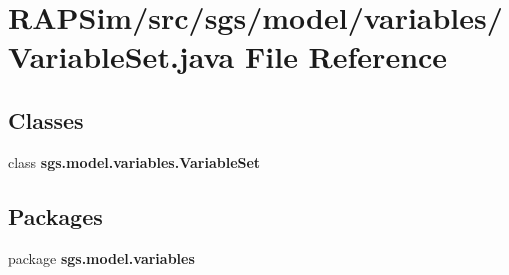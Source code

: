 \section{R\-A\-P\-Sim/src/sgs/model/variables/\-Variable\-Set.java File Reference}
\label{_variable_set_8java}
\subsection*{Classes}
\begin{DoxyCompactItemize}
\item 
class {\bf sgs.\-model.\-variables.\-Variable\-Set}
\end{DoxyCompactItemize}
\subsection*{Packages}
\begin{DoxyCompactItemize}
\item 
package {\bf sgs.\-model.\-variables}
\end{DoxyCompactItemize}

